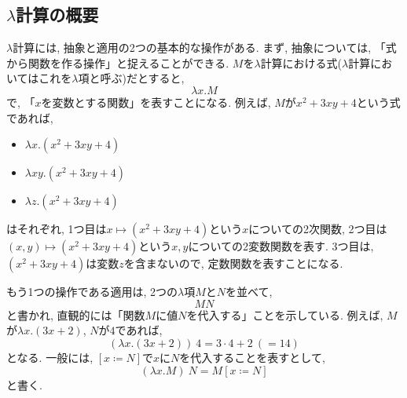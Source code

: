 \documentclass[11pt]{jsreport}
\theoremstyle{mystyle}
\newcommand{\0}{\textbf{0}}
\begin{document}
\subsection*{$\lambda$計算の概要}
$\lambda$計算には, 抽象と適用の2つの基本的な操作がある. まず, 抽象については, 「式から関数を作る操作」と捉えることができる. $M$を$\lambda$計算における式($\lambda$計算においてはこれを$\lambda$項と呼ぶ)だとすると, 
\[
  \lambda x . M
\]
で, 「$x$を変数とする関数」を表すことになる. 
例えば, $M$が$x^2 + 3xy + 4$という式であれば, 
\begin{itemize}
  \item $\lambda x . (x^2 + 3xy + 4)$
  \item $\lambda xy . (x^2 + 3xy + 4)$
  \item $\lambda z . (x^2 + 3xy + 4)$
\end{itemize}
はそれぞれ, 1つ目は$x \mapsto (x^2 + 3xy + 4)$という$x$についての2次関数, 
2つ目は$(x, y) \mapsto (x^2 + 3xy + 4)$という$x, y$についての2変数関数を表す. 
3つ目は, $(x^2 + 3xy + 4)$は変数$z$を含まないので, 定数関数を表すことになる.

もう1つの操作である適用は, 2つの$\lambda$項$M$と$N$を並べて, 
\[
  MN
\]
と書かれ, 直観的には「関数$M$に値$N$を代入する」ことを示している. 
例えば, $M$が$\lambda x . (3x + 2)$, $N$が$4$であれば, 
\[
  (\lambda x . (3x + 2))\ 4 = 3 \cdot 4 + 2\ (= 14)
\]
となる. 一般には, $[x \coloneqq N]$で$x$に$N$を代入することを表すとして, 
\[
  (\lambda x. M)\ N = M[x\coloneqq N]
\]
と書く. 
\end{document}
